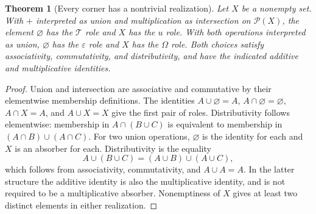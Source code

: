 \documentclass[11pt]{article}
\newtheorem{theorem}{Theorem}
\begin{document}
\begin{theorem}[Every corner has a nontrivial realization]
Let $X$ be a nonempty set. With $+$ interpreted as union and multiplication as intersection on $\mathcal P(X)$, the element $\varnothing$ has the $\mathcal T$ role and $X$ has the $u$ role. With both operations interpreted as union, $\varnothing$ has the $\varepsilon$ role and $X$ has the $\Omega$ role. Both choices satisfy associativity, commutativity, and distributivity, and have the indicated additive and multiplicative identities.
\end{theorem}
\begin{proof}
Union and intersection are associative and commutative by their elementwise membership definitions. The identities $A\cup\varnothing=A$, $A\cap\varnothing=\varnothing$, $A\cap X=A$, and $A\cup X=X$ give the first pair of roles. Distributivity follows elementwise: membership in $A\cap(B\cup C)$ is equivalent to membership in $(A\cap B)\cup(A\cap C)$.
For two union operations, $\varnothing$ is the identity for each and $X$ is an absorber for each. Distributivity is the equality
\[
A\cup(B\cup C)=(A\cup B)\cup(A\cup C),
\]
which follows from associativity, commutativity, and $A\cup A=A$. In the latter structure the additive identity is also the multiplicative identity, and is not required to be a multiplicative absorber. Nonemptiness of $X$ gives at least two distinct elements in either realization.
\end{proof}
\end{document}
